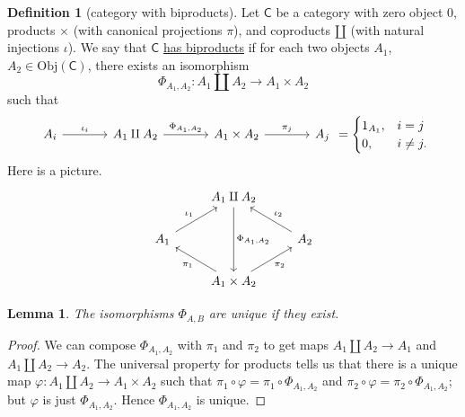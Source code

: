\documentclass[a4paper]{report}
\newcommand{\defn}[1]{\ul{#1}}
\newcommand{\Obj}{\mathrm{Obj}}
\theoremstyle{definition}
\newtheorem{definition}{Definition}[section]
\theoremstyle{plain}
\newtheorem{lemma}{Lemma}[section]
\theoremstyle{remark}
\begin{document}
\begin{definition}[category with biproducts]
  \label{def:categorywithbiproducts}
  Let $\mathsf{C}$ be a category with zero object $0$, products $\times$ (with canonical projections $\pi$), and coproducts $\amalg$ (with natural injections $\iota$). We say that $\mathsf{C}$ \defn{has biproducts} if for each two objects $A_{1}$, $A_{2} \in \Obj(\mathsf{C})$, there exists an isomorphism
  \begin{equation*}
    \Phi_{A_{1}, A_{2}}\colon A_{1} \amalg A_{2} \to A_{1} \times A_{2}
  \end{equation*}
  such that 
  \begin{equation*}
    \begin{tikzcd}[column sep=large]
      A_{i}
      \arrow[r, "\iota_{i}"]
      & A_{1} \amalg A_{2} 
      \arrow[r, "{\Phi_{A_{1}, A_{2}}}"]
      & A_{1} \times A_{2}
      \arrow[r, "\pi_{j}"]
      & A_{j}
    \end{tikzcd}
    =
    \begin{cases}
      1_{A_{1}}, & i = j \\
      0, & i \neq j.
    \end{cases}
  \end{equation*}
  Here is a picture.
  \begin{equation*}
    \begin{tikzcd}
      & A_{1} \amalg A_{2} 
      \arrow[dd, "\Phi_{A_{1},A_{2}}"]
      \\
      A_{1} 
      \arrow[ur, "\iota_{1}"]
      & & A_{2}
      \arrow[ul, swap, "\iota_{2}"]
      \\
      & A_{1} \times A_{2}
      \arrow[ul, "\pi_{1}"]
      \arrow[ur, swap, "\pi_{2}"]
    \end{tikzcd}
  \end{equation*}
\end{definition}

\begin{lemma}
  The isomorphisms $\Phi_{A, B}$ are unique if they exist. 
\end{lemma}
\begin{proof}
  We can compose $\Phi_{A_{1}, A_{2}}$ with $\pi_{1}$ and $\pi_{2}$ to get maps $A_{1} \amalg A_{2} \to A_{1}$ and $A_{1} \amalg A_{2} \to A_{2}$. The universal property for products tells us that there is a unique map $\varphi\colon A_{1} \amalg A_{2} \to A_{1} \times A_{2}$ such that $\pi_{1} \circ \varphi = \pi_{1} \circ \Phi_{A_{1}, A_{2}}$ and $\pi_{2} \circ \varphi = \pi_{2} \circ \Phi_{A_{1}, A_{2}}$; but $\varphi$ is just $\Phi_{A_{1}, A_{2}}$. Hence $\Phi_{A_{1}, A_{2}}$ is unique.
\end{proof}
\end{document}
